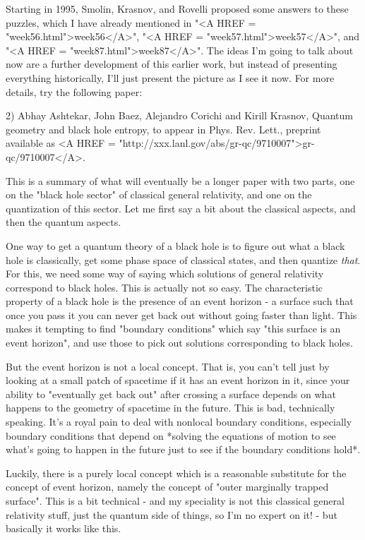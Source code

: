 Starting in 1995, Smolin, Krasnov, and Rovelli proposed some answers to
these puzzles, which I have already mentioned in "<A HREF = "week56.html">week56</A>", "<A HREF = "week57.html">week57</A>", and
"<A HREF = "week87.html">week87</A>".  The ideas I'm going to talk about now are a further
development of this earlier work, but instead of presenting everything
historically, I'll just present the picture as I see it now.  For more
details, try the following paper:

2) Abhay Ashtekar, John Baez, Alejandro Corichi and Kirill Krasnov,
Quantum geometry and black hole entropy, to appear in Phys. Rev.
Lett., preprint available as
<A HREF = "http://xxx.lanl.gov/abs/gr-qc/9710007">gr-qc/9710007</A>.

This is a summary of what will eventually be a longer paper with two
parts, one on the "black hole sector" of classical general relativity,
and one on the quantization of this sector.   Let me first say a bit
about the classical aspects, and then the quantum aspects.

One way to get a quantum theory of a black hole is to figure out what a
black hole is classically, get some phase space of classical states, and
then quantize \emph{that}.  For this, we need some way of saying which
solutions of general relativity correspond to black holes.  This is
actually not so easy.  The characteristic property of a black hole is
the presence of an event horizon - a surface such that once you pass
it you can never get back out without going faster than light.  This
makes it tempting to find "boundary conditions" which say "this surface
is an event horizon", and use those to pick out solutions corresponding
to black holes.

But the event horizon is not a local concept.  That is, you can't tell
just by looking at a small patch of spacetime if it has an event horizon
in it, since your ability to "eventually get back out" after crossing a
surface depends on what happens to the geometry of spacetime in the
future.  This is bad, technically speaking.  It's a royal pain to deal
with nonlocal boundary conditions, especially boundary conditions that
depend on *solving the equations of motion to see what's going to happen
in the future just to see if the boundary conditions hold*.

Luckily, there is a purely local concept which is a reasonable
substitute for the concept of event horizon, namely the concept of
"outer marginally trapped surface".  This is a bit technical - and my
speciality is not this classical general relativity stuff, just the
quantum side of things, so I'm no expert on it! - but basically it
works like this.

